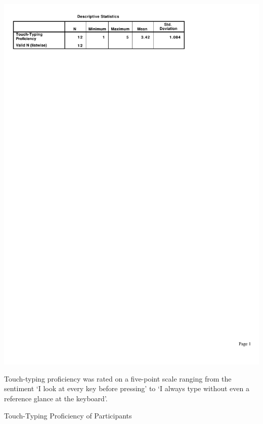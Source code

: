 \documentclass[a4paper, 12pt]{report}
\begin{document}
\begin{table}[ht]
\centerline{\includegraphics{figures/TouchTyping.pdf}}
\label{fig:partic_ttype}
\medskip
\small
Touch-typing proficiency was rated on a five-point scale ranging from the sentiment `I look at every key before pressing' to `I always type without even a reference glance at the keyboard'.
\caption{Touch-Typing Proficiency of Participants}
\end{table}


\newcommand{\anumero}{{\fontfamily{cmr}\selectfont\textnumero}}
\end{document}
